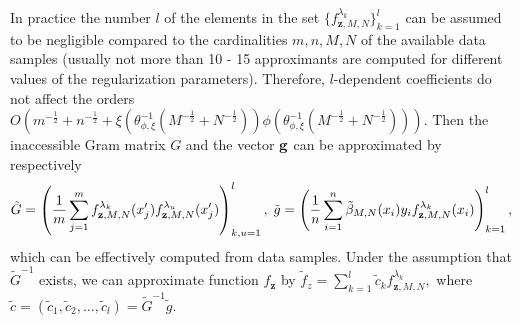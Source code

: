 \documentclass[USenglish]{article}
\begin{document}
In practice the number $l$ of the elements in the set $\{ f_{\mathbf{z},M,N}^{\lambda_k} \}_{k=1}^l$ can be assumed to be negligible compared to the cardinalities $m,n,M,N$ of the available data samples (usually not more than 10 - 15 approximants are computed for different values of the regularization parameters). Therefore, $l$-dependent coefficients do not affect the orders $O\left(  m^{-\frac{1}{2}} + n^{-\frac{1}{2}} + \xi (\theta_{\phi,\xi}^{-1} (M^{-\frac{1}{2}}  + N^{-\frac{1}{2}}) ) \phi (\theta_{\phi,\xi}^{-1} (M^{-\frac{1}{2}}  + N^{-\frac{1}{2}} ) )\right)$. Then the inaccessible Gram matrix $G$ and the vector ${{\bf g}}$ can be approximated by respectively 
    \begin{align*}
	\tilde{G} = \left( \frac{1}{m} \sum_{j = 1}^m f_{\mathbf{z},M,N}^{\lambda_k} (x_j') f_{\mathbf{z},M,N}^{\lambda_u} (x_j') \right)_{k,u = 1}^l,\hspace*{0.1cm}
	\tilde{g} = \left( \frac{1}{n} \sum_{i = 1}^n \tilde{\beta}_{M,N} (x_i) y_i f_{\mathbf{z},M,N}^{\lambda_k} (x_i) \right)_{k=1}^l,
	\end{align*}
which can be effectively computed from data samples. Under the assumption that $\tilde{G}^{-1}$ exists, we can approximate function $f_\mathbf{z}$ by $\tilde{f}_z = \sum_{k = 1}^l \tilde{c}_k f_{\mathbf{z},M,N}^{\lambda_k},$ where $\tilde{c} = (\tilde{c}_1,\tilde{c}_2,\ldots,\tilde{c}_l) = \tilde{G}^{-1} \tilde{g}$.
\end{document}
